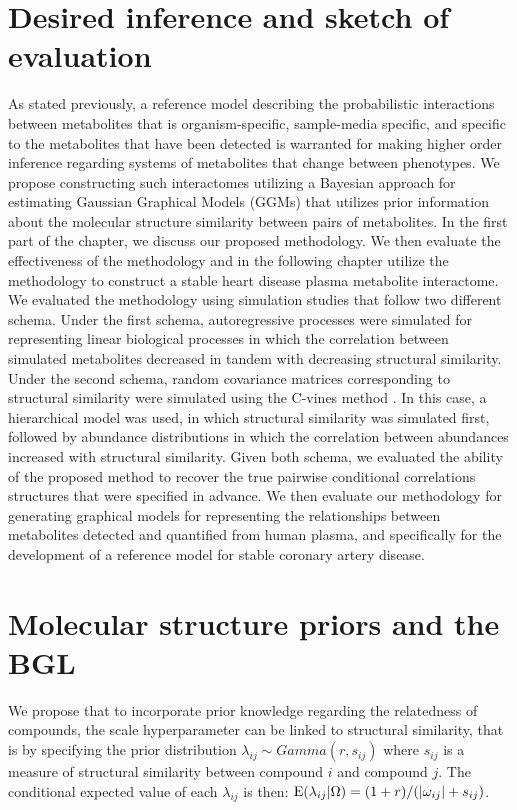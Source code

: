 \label{structureADBGL}
\begin{DoubleSpace}
\section{Desired inference and sketch of evaluation}
As stated previously, a reference model describing the probabilistic interactions between metabolites that is organism-specific, sample-media specific, and specific to the metabolites that have been detected is warranted for making higher order inference regarding systems of metabolites that change between phenotypes. We propose constructing such interactomes utilizing a Bayesian approach for estimating Gaussian Graphical Models (GGMs) that utilizes prior information about the molecular structure similarity between pairs of metabolites. In the first part of the chapter, we discuss our proposed methodology. We then evaluate the effectiveness of the methodology and in the following chapter utilize the methodology to construct a stable heart disease plasma metabolite interactome. We evaluated the methodology using simulation studies that follow two different schema. Under the first schema, autoregressive processes were simulated for representing linear biological processes in which the correlation between simulated metabolites decreased in tandem with decreasing structural similarity. Under the second schema, random covariance matrices corresponding to structural similarity were simulated using the C-vines method \cite{lewandowski2009}. In this case, a hierarchical model was used, in which structural similarity was simulated first, followed by abundance distributions in which the correlation between abundances increased with structural similarity. Given both schema, we evaluated the ability of the proposed method to recover the true pairwise conditional correlations structures that were specified in advance. We then evaluate our methodology for generating graphical models for representing the relationships between metabolites detected and quantified from human plasma, and specifically for the development of a reference model for stable coronary artery disease. 

\section{Molecular structure priors and the BGL}
We propose that to incorporate prior knowledge regarding the relatedness of compounds, the scale hyperparameter can be linked to structural similarity, that is by specifying the prior distribution $\lambda_{ij}\sim Gamma(r,s_{ij})$ where $s_{ij}$ is a measure of structural similarity between compound $i$ and compound $j$. The conditional expected value of each $\lambda_{ij}$ is then: $\operatorname{E}(\lambda_{ij}|\Omega)=(1+r)/(|\omega_{ij} |+s_{ij})$.


\end{DoubleSpace}
